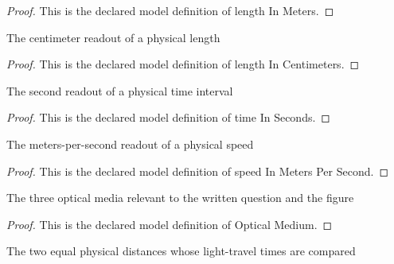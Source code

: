 \begin{proof}
  This is the declared model definition of length In Meters.
\end{proof}
\begin{definition}
  \label{def:physics:phyx-mini-0107:phyxminiproblems-problemphyxmini0107-lengthincentimeters}
  The centimeter readout of a physical length
\end{definition}
\begin{proof}
  This is the declared model definition of length In Centimeters.
\end{proof}
\begin{definition}
  \label{def:physics:phyx-mini-0107:phyxminiproblems-problemphyxmini0107-timeinseconds}
  The second readout of a physical time interval
\end{definition}
\begin{proof}
  This is the declared model definition of time In Seconds.
\end{proof}
\begin{definition}
  \label{def:physics:phyx-mini-0107:phyxminiproblems-problemphyxmini0107-speedinmeterspersecond}
  The meters-per-second readout of a physical speed
\end{definition}
\begin{proof}
  This is the declared model definition of speed In Meters Per Second.
\end{proof}
\begin{definition}
  \label{def:physics:phyx-mini-0107:phyxminiproblems-problemphyxmini0107-opticalmedium}
  The three optical media relevant to the written question and the figure
\end{definition}
\begin{proof}
  This is the declared model definition of Optical Medium.
\end{proof}
\begin{definition}
  \label{def:physics:phyx-mini-0107:phyxminiproblems-problemphyxmini0107-travelroute}
  The two equal physical distances whose light-travel times are compared
\end{definition}
